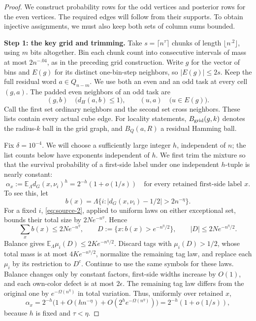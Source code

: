 \begin{proof}
We construct probability rows for the odd vertices and posterior rows for the even vertices. The required edges will follow from their supports. To obtain injective assignments, we must also keep both sets of column sums bounded.

\noindent\textbf{Step 1: the key grid and trimming.}\quad
Take \(s=\lceil n^\tau\rceil\) chunks of length \(\lfloor n^{.2}\rfloor\), using \(m\) bits altogether. Bin each chunk count into consecutive intervals of mass at most \(2n^{-.04}\), as in the preceding grid construction. Write \(g\) for the vector of bins and \(E(g)\) for its distinct one-bin-step neighbors, so \(|E(g)|\le2s\). Keep the full residual word \(a\in Q_{n-m}\). We use both an even and an odd task at every cell \((g,a)\). The padded even neighbors of an odd task are
\[
 (g,b)\quad\bigl(d_H(a,b)\le1\bigr),
 \qquad (u,a)\quad\bigl(u\in E(g)\bigr).
\]
Call the first set ordinary neighbors and the second set cross neighbors. These lists contain every actual cube edge. For locality statements, \(B_{\rm grid}(g,k)\) denotes the radius-\(k\) ball in the grid graph, and \(B_Q(a,R)\) a residual Hamming ball.

Fix \(\delta=10^{-4}\). We will choose a sufficiently large integer \(h\), independent of \(n\); the list counts below have exponents independent of \(h\). We first trim the mixture so that the survival probability of a first-side label under one independent \(h\)-tuple is nearly constant:
\[
 \alpha_x:=\mathbb E_\Lambda d_G(x,\nu_i)^h
       =2^{-h}(1+o(1/s))
 \quad\text{for every retained first-side label }x.
\]
To see this, let
\[
 b(x)=\Lambda\{i:|d_G(x,\nu_i)-1/2|>2n^{-\eta}\}.
\]
For a fixed \(i\), \eqref{eq:source-2}, applied to uniform laws on either exceptional set, bounds their total size by \(2Ne^{-n^\eta}\). Hence
\[
 \sum_x b(x)\le2Ne^{-n^\eta},\qquad
 D:=\{x:b(x)>e^{-n^\eta/2}\},\qquad
 |D|\le2Ne^{-n^\eta/2}.
\]
Balance gives \(\mathbb E_\Lambda\mu_i(D)\le2K e^{-n^\eta/2}\). Discard tags with \(\mu_i(D)>1/2\), whose total mass is at most \(4K e^{-n^\eta/2}\), normalize the remaining tag law, and replace each \(\mu_i\) by its restriction to \(D^c\). Continue to use the same symbols for these laws. Balance changes only by constant factors, first-side widths increase by \(O(1)\), and each own-color defect is at most \(2\epsilon\). The remaining tag law differs from the original one by \(e^{-\Omega(n^\eta)}\) in total variation. Thus, uniformly over retained \(x\),
\[
 \alpha_x
 =2^{-h}\bigl(1+O(hn^{-\eta})
                  +O(2^h e^{-\Omega(n^\eta)})\bigr)
 =2^{-h}(1+o(1/s)),
\]
because \(h\) is fixed and \(\tau<\eta\).


\end{proof}
